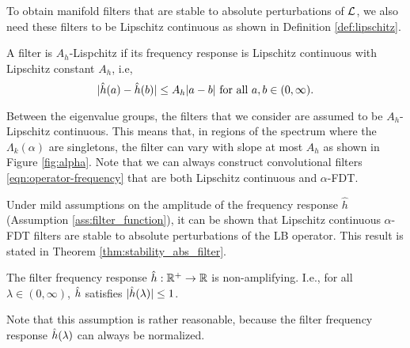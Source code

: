 To obtain manifold filters that are stable to absolute perturbations of ${\mathcal L}$, we also need these filters to be Lipschitz continuous as shown in Definition \ref{def:lipschitz}.

\begin{definition} \label{def:lipschitz}
A filter is $A_h$-Lispchitz if its frequency response is Lipschitz continuous with Lipschitz constant $A_h$, i.e,
\begin{equation}
    |{\hat h}(a)-{\hat h}(b)| \leq A_h |a-b|\text{ for all } a,b \in (0,\infty)\text{.}
\end{equation}
\end{definition}

Between the eigenvalue groups, the filters that we consider are assumed to be $A_h$-Lipschitz continuous. This means that, in regions of the spectrum where the $\Lambda_k(\alpha)$ are singletons, the filter can vary with slope at most $A_h$ as shown in Figure \ref{fig:alpha}. Note that we can always construct convolutional filters \eqref{eqn:operator-frequency} that are both Lipschitz continuous and $\alpha$-FDT.

Under mild assumptions on the amplitude of the frequency response $\hat{h}$ (Assumption \ref{ass:filter_function}), it can be shown that Lipschitz continuous $\alpha$-FDT filters are stable to absolute perturbations of the LB operator. This result is stated in Theorem \ref{thm:stability_abs_filter}.

\begin{assumption} \label{ass:filter_function}
The filter frequency response ${\hat h}:{\mathbb R}^+\rightarrow{\mathbb R}$ is non-amplifying. I.e., for all $\lambda\in(0,\infty)$, ${\hat h}$ satisfies $|{\hat h}(\lambda)|\leq 1$.
\end{assumption}

Note that this assumption is rather reasonable, because the filter frequency response ${\hat h}(\lambda)$ can always be normalized.

